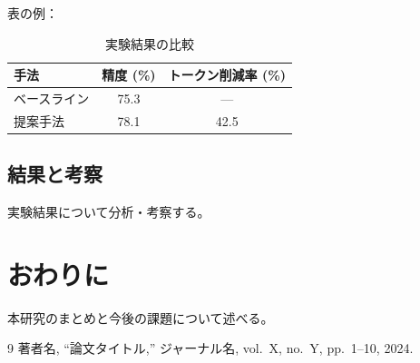 \documentclass[a4paper,11pt]{jsarticle}
\begin{document}
表の例：
\begin{table}[h]
  \centering
  \caption{実験結果の比較}
  \begin{tabular}{lcc}
    \hline
    手法 & 精度 (\%) & トークン削減率 (\%) \\
    \hline
    ベースライン & 75.3 & --- \\
    提案手法 & 78.1 & 42.5 \\
    \hline
  \end{tabular}
\end{table}

\subsection{結果と考察}
実験結果について分析・考察する。

\section{おわりに}
本研究のまとめと今後の課題について述べる。

\begin{thebibliography}{9}
    著者名,
    ``論文タイトル,''
    ジャーナル名,
    vol.~X, no.~Y, pp.~1--10,
    2024.
\end{thebibliography}
\end{document}
